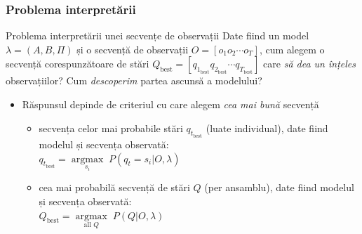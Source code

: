 

\begin{frame}
  \frametitle{Problema interpretării}
  \begin{block}{Problema interpretării unei secvențe de observații}
    Date fiind un model   \alert{$\lambda=(A,B,\Pi)$} și o
    secvență de observații \alert{$O = [ o_1 o_2 \cdots o_T ]$}, 
    cum alegem o secvență corespunzătoare de stări
    \alert{$Q_{\text{best}} = [ q_{1_{\text{best}}} q_{2_{\text{best}}} \cdots q_{T_{\text{best}}} ]$} care \emph{să
      dea un înțeles} observațiilor? Cum \emph{descoperim} partea
    ascunsă a modelului?
  \end{block}\pause
  \begin{itemize}
  \item Răspunsul depinde de criteriul cu care alegem \emph{cea mai bună} secvență\pause
    \begin{itemize}
    \item \alert{secvența celor mai probabile stări $q_{t_{\text{best}}}$} (luate individual), date fiind modelul și secvența observată:\\
      $q_{t_{\text{best}}} = \underset{s_i}{\operatorname{argmax}}\; P(q_t = s_i \vert O, \lambda)$
    \item \alert{cea mai probabilă secvență de stări $Q$} (per ansamblu), date fiind modelul și secvența observată:\\
      $Q_{\text{best}} = \underset{\text{all }Q}{\operatorname{argmax}}\; P(Q \vert O, \lambda)$
    \end{itemize}
  \end{itemize}
\end{frame}


